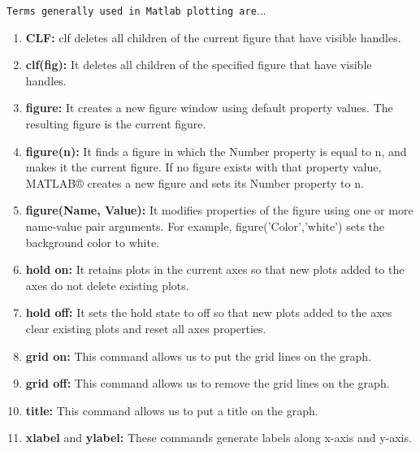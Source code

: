 \documentclass{plot-softwaremanual}
\begin{document}
\texttt {Terms generally used in Matlab plotting are}...\\
    \begin{enumerate}
    
    \item {\textbf {CLF:}} clf deletes all children of the current figure that have visible handles.
    
    \item {\textbf {clf(fig):}} It deletes all children of the specified figure that have visible handles.
    
    \item {\textbf {figure:}} It creates a new figure window using default property values. The resulting figure is the current figure.
    
    \item {\textbf {figure(n):}} It  finds a figure in which the Number property is equal to n, and makes it the current figure. If no figure exists with that property value, MATLAB® creates a new figure and sets its Number property to n.
    
    \item {\textbf {figure(Name, Value):}} It modifies properties of the figure using one or more name-value pair arguments. For example, figure('Color','white') sets the background color to white.
    
    
    \item {\textbf {hold on:}} It retains plots in the current axes so that new plots added to the axes do not delete existing plots. 
    
    \item {\textbf {hold off:}} It sets the hold state to off so that new plots added to the axes clear existing plots and reset all axes properties. 
    
    \item {\textbf {grid on:}} This command allows us to put the grid lines on the graph.
    
    \item {\textbf {grid off:}} This command allows us to remove the grid lines on the graph.
    
    \item {\textbf {title:}} This command allows us to put a title on the graph.
    
    \item {\textbf {xlabel}} and {\textbf {ylabel:}} These commands generate labels along x-axis and y-axis.
    
 
    

\end{enumerate}
\end{document}
